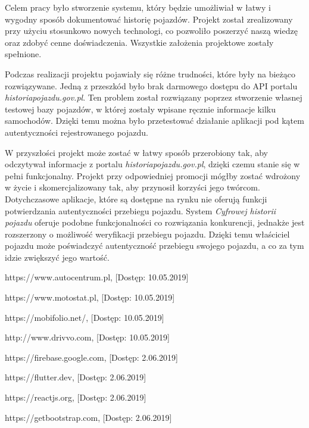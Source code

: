 \documentclass[12pt]{article}
\begin{document}
Celem pracy było stworzenie systemu, który będzie umożliwiał w łatwy i wygodny sposób dokumentować historię pojazdów. Projekt został zrealizowany przy użyciu stosunkowo nowych technologi, co pozwoliło poszerzyć naszą wiedzę oraz zdobyć cenne doświadczenia. Wszystkie założenia projektowe zostały spełnione.

Podczas realizacji projektu pojawiały się różne trudności, które były na bieżąco rozwiązywane. Jedną z przeszkód było brak darmowego dostępu do API portalu \textit{historiapojazdu.gov.pl}. Ten problem został rozwiązany poprzez stworzenie własnej testowej bazy pojazdów, w której zostały wpisane ręcznie informacje kilku samochodów. Dzięki temu można było przetestować działanie aplikacji pod kątem autentyczności rejestrowanego pojazdu.

W przyszłości projekt może zostać w łatwy sposób przerobiony tak, aby odczytywał informacje z portalu \textit{historiapojazdu.gov.pl}, dzięki czemu stanie się w pełni funkcjonalny. Projekt przy odpowiedniej promocji mógłby zostać wdrożony w życie i skomercjalizowany tak, aby przynosił korzyści jego twórcom. Dotychczasowe aplikacje, które są dostępne na rynku nie oferują funkcji potwierdzania autentyczności przebiegu pojazdu. System \textit{Cyfrowej historii pojazdu} oferuje podobne funkcjonalności co rozwiązania konkurencji, jednakże jest rozszerzony o możliwość weryfikacji przebiegu pojazdu. Dzięki temu właściciel pojazdu może poświadczyć autentyczność przebiegu swojego pojazdu, a co za tym idzie zwiększyć jego wartość.


\newpage
\renewcommand\refname{Bibliografia}
\begin{thebibliography}{9}

  https://www.autocentrum.pl, [Dostęp: 10.05.2019]

  https://www.motostat.pl, [Dostęp: 10.05.2019]

 https://mobifolio.net/, [Dostęp: 10.05.2019]

  http://www.drivvo.com, [Dostęp: 10.05.2019]

  https://firebase.google.com, [Dostęp: 2.06.2019]

  https://flutter.dev, [Dostęp: 2.06.2019]

  https://reactjs.org, [Dostęp: 2.06.2019]

  https://getbootstrap.com, [Dostęp: 2.06.2019]
\end{thebibliography}
\end{document}
